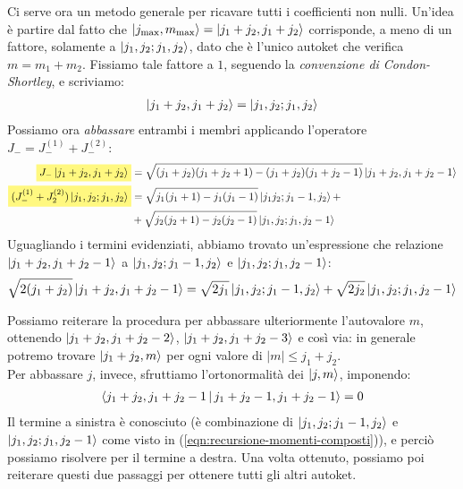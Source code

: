 \documentclass[../../FisicaTeorica.tex]{subfiles}
\begin{document}
Ci serve ora un metodo generale per ricavare tutti i coefficienti non nulli. Un'idea è partire dal fatto che $\Ket{j_{\max}, m_{\max}}=\Ket{j_1 + j_2, j_1+j_2}$ corrisponde, a meno di un fattore, solamente a $\Ket{j_1, j_2; j_1, j_2}$, dato che è l'unico autoket che verifica $m = m_1 + m_2$. Fissiamo tale fattore a $1$, seguendo la \textit{convenzione di Condon-Shortley}, e scriviamo:
\begin{align*}
\Ket{j_1 + j_2, j_1 + j_2} = \Ket{j_1, j_2; j_1, j_2}
\end{align*}
Possiamo ora \textit{abbassare} entrambi i membri applicando l'operatore $J_{-} = J_{-}^{(1)} + J_{-}^{(2)}$:
\begin{align}\nonumber
\hlc{Yellow}{J_- \ket{j_1 + j_2 , j_1 + j_2}} &= \sqrt{(j_1 + j_2)(j_1 + j_2 +1)- (j_1 + j_2)(j_1 + j_2 -1)}\ket{j_1+j_2, j_1+j_2-1}\\\nonumber
\hlc{Yellow}{(J_-^{(1)}+J_2^{(2)})\ket{j_1, j_2;j_1, j_2}} &= \sqrt{j_1(j_1+1)-j_1(j_1-1)}\ket{j_1 j_2; j_1-1, j_2}+\\
&+\sqrt{j_2(j_2+1)-j_2(j_2-1)}\ket{j_1, j_2;j_1, j_2-1}
\label{eqn:recursione-momenti-composti}
\end{align}
Uguagliando i termini evidenziati, abbiamo trovato un'espressione che relazione $\Ket{j_1+j_2, j_1+j_2-1}$ a $\Ket{j_1, j_2; j_1-1, j_2}$ e $\Ket{j_1, j_2; j_1, j_2-1}$:
\begin{align}
\sqrt{2(j_1+j_2)} \Ket{j_1+j_2, j_1+j_2-1} = \sqrt{2j_1} \Ket{j_1, j_2; j_1-1,j_2}+\sqrt{2j_2}\Ket{j_1, j_2; j_1, j_2-1}
\label{eqn:abbasso-alto}
\end{align}

Possiamo reiterare la procedura per abbassare ulteriormente l'autovalore $m$, ottenendo $\Ket{j_1+j_2, j_1+j_2-2}$, $\Ket{j_1+j_2, j_1+j_2-3}$ e così via: in generale potremo trovare $\Ket{j_1+j_2, m}$ per ogni valore di $|m|\leq j_1+j_2$.\\

Per abbassare $j$, invece, sfruttiamo l'ortonormalità dei $\Ket{j,m}$, imponendo:
\begin{align*}
\Braket{j_1+j_2, j_1+j_2-1|j_1+j_2-1, j_1+j_2-1}=0
\end{align*}
Il termine a sinistra è conosciuto (è combinazione di $\Ket{j_1, j_2; j_1-1, j_2}$ e $\Ket{j_1, j_2; j_1, j_2-1}$ come visto in (\ref{eqn:recursione-momenti-composti})), e perciò possiamo risolvere per il termine a destra. Una volta ottenuto, possiamo poi reiterare questi due passaggi per ottenere tutti gli altri autoket.\\
\end{document}
